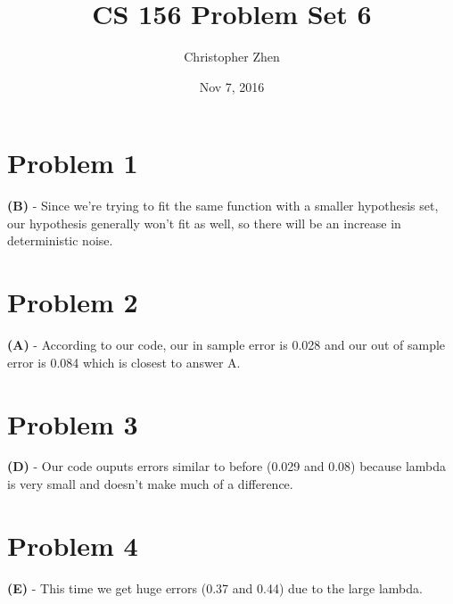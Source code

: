 \documentclass[10pt,letter]{article}
\begin{document}


\title{CS 156 Problem Set 6}

\author{Christopher Zhen}

\date{Nov 7, 2016}
 
\maketitle 
	
\section*{Problem 1}

\textbf{(B)} - Since we're trying to fit the same function with a smaller hypothesis set, our hypothesis generally won't fit as well, so there will be an increase in deterministic noise.

\section*{Problem 2}

\textbf{(A)} - According to our code, our in sample error is 0.028 and our out of sample error is 0.084 which is closest to answer A.


\section*{Problem 3} 

\textbf{(D)} - Our code ouputs errors similar to before (0.029 and 0.08) because lambda is very small and doesn't make much of a difference.

\section*{Problem 4}

\textbf{(E)} - This time we get huge errors (0.37 and 0.44) due to the large lambda.
\end{document}
